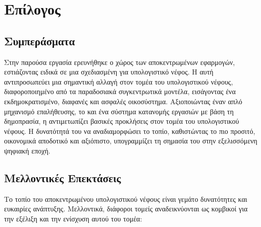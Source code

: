 \chapter{Επίλογος}

\section{Συμπεράσματα}
Στην παρούσα εργασία ερευνήθηκε ο χώρος των αποκεντρωμένων εφαρμογών, εστιάζοντας ειδικά σε μια  σχεδιασμένη για υπολογιστικό νέφος. Η  αυτή αντιπροσωπεύει μια σημαντική αλλαγή στον τομέα του υπολογιστικού νέφους, διαφοροποιημένο από τα παραδοσιακά συγκεντρωτικά μοντέλα, εισάγοντας ένα εκδημοκρατισμένο, διαφανές και ασφαλές οικοσύστημα. Αξιοποιώντας έναν απλό μηχανισμό επαλήθευσης, το  και ένα σύστημα κατανομής εργασιών με βάση τη δημοπρασία, η  αντιμετωπίζει βασικές προκλήσεις στον τομέα του υπολογιστικού νέφους. Η δυνατότητά του να αναδιαμορφώσει το τοπίο, καθιστώντας το  πιο προσιτό, οικονομικά αποδοτικό και αξιόπιστο, υπογραμμίζει τη σημασία του στην εξελισσόμενη ψηφιακή εποχή.

\section{Μελλοντικές Επεκτάσεις}
Το τοπίο του αποκεντρωμένου υπολογιστικού νέφους είναι γεμάτο δυνατότητες και ευκαιρίες ανάπτυξης. Μελλοντικά, διάφοροι τομείς αναδεικνύονται ως κομβικοί για την εξέλιξη και την ενίσχυση αυτού του τομέα:

